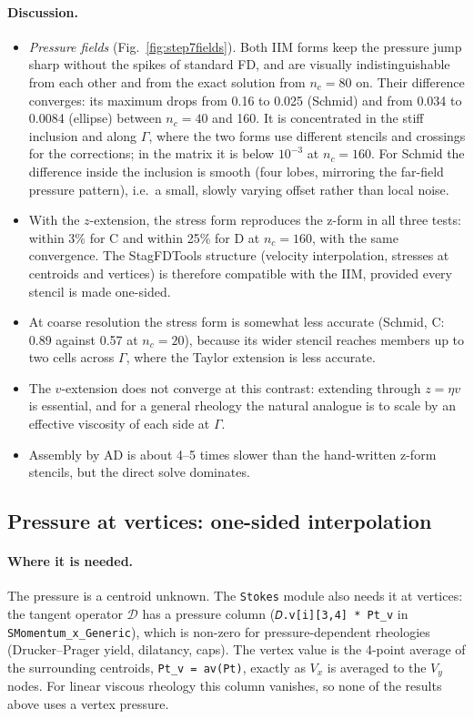\documentclass[11pt,a4paper]{article}
\newcommand{\code}[1]{\texttt{#1}}
\begin{document}
\paragraph{Discussion.}
\begin{itemize}
  \item \emph{Pressure fields} (Fig.~\ref{fig:step7fields}). Both IIM forms keep the pressure
    jump sharp without the spikes of standard FD, and are visually indistinguishable from each
    other and from the exact solution from $n_c=80$ on. Their difference converges: its maximum
    drops from 0.16 to 0.025 (Schmid) and from 0.034 to 0.0084 (ellipse) between $n_c=40$ and
    160. It is concentrated in the stiff inclusion and along $\Gamma$, where the two forms
    use different stencils and crossings for the corrections; in the matrix it is below
    $10^{-3}$ at $n_c=160$. For Schmid the difference inside the inclusion is smooth (four
    lobes, mirroring the far-field pressure pattern), i.e.\ a small, slowly varying offset
    rather than local noise.
  \item With the $z$-extension, the stress form reproduces the z-form in all three tests:
    within 3\% for C and within 25\% for D at $n_c=160$, with the same convergence. The
    StagFDTools structure (velocity interpolation, stresses at centroids and vertices) is
    therefore compatible with the IIM, provided every stencil is made one-sided.
  \item At coarse resolution the stress form is somewhat less accurate (Schmid, C: 0.89 against
    0.57 at $n_c=20$), because its wider stencil reaches members up to two cells across
    $\Gamma$, where the Taylor extension is less accurate.
  \item The $v$-extension does not converge at this contrast: extending through $z=\eta v$ is
    essential, and for a general rheology the natural analogue is to scale by an effective
    viscosity of each side at $\Gamma$.
  \item Assembly by AD is about 4--5 times slower than the hand-written z-form stencils, but the
    direct solve dominates.
\end{itemize}

\subsection*{Pressure at vertices: one-sided interpolation}

\paragraph{Where it is needed.} The pressure is a centroid unknown. The \code{Stokes} module
also needs it at vertices: the tangent operator $\mathcal D$ has a pressure column
(\code{𝐷.v[i][3,4] * Pt\_v} in \code{SMomentum\_x\_Generic}), which is non-zero for
pressure-dependent rheologies (Drucker--Prager yield, dilatancy, caps). The vertex value is the
4-point average of the surrounding centroids, \code{Pt\_v = av(Pt)}, exactly as $V_x$ is averaged
to the $V_y$ nodes. For linear viscous rheology this column vanishes, so none of the results above
uses a vertex pressure.
\end{document}
